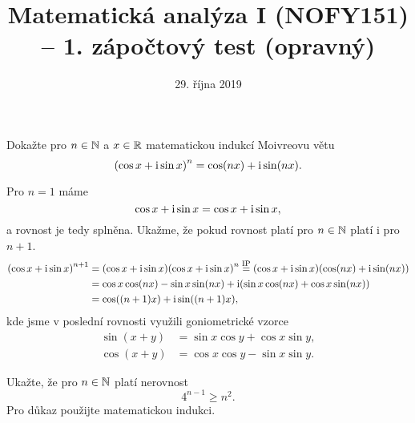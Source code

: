 \documentclass[answers]{exam}
\title{\vspace{-3ex}Matematická analýza I (NOFY151) – 1. zápočtový test (opravný)\vspace{-1ex}}
\author{\vspace{-2ex}}
\date{\vspace{-2ex}29. října 2019}
\begin{document}
\maketitle

\begin{questions}
  \question[2] Dokažte pro $n \in \mathbb{N}$ a $x \in \mathbb{R}$ matematickou indukcí Moivreovu větu
  \begin{equation*}
    \parens{\cos x + \iunit \sin x}^n
    =
    \cos (nx) + \iunit \sin (nx).
  \end{equation*}
  
  \begin{solution}
    Pro $n = 1$ máme
    \begin{equation*}
      \cos x + \mathrm{i} \sin x
      =
      \cos x + \mathrm{i} \sin x,
    \end{equation*}
    a rovnost je tedy splněna. Ukažme, že pokud rovnost platí pro $n \in \mathbb{N}$ platí i pro $n + 1$. 
    \begin{align*}
      \parens{\cos x + \iunit \sin x}^{n + 1}
      &=
      \parens{\cos x + \iunit \sin x} \parens{\cos x + \iunit \sin x}^n
      \texteq{IP}
      \parens{\cos x + \iunit \sin x}
      \parens{\cos (nx) + \iunit \sin (nx)}
      \\
      &=
      \cos x \cos (nx) - \sin x \sin (nx)
      +
      \iunit
      \parens{ \sin x \cos (nx) + \cos x \sin (nx) }
      \\
      &=
      \cos \parens{(n + 1) x} + \iunit \sin \parens{(n + 1) x},
    \end{align*}
    kde jsme v poslední rovnosti využili goniometrické vzorce
    \begin{align*}
      \sin (x + y) &= \sin x \cos y + \cos x \sin y,
      \\
      \cos (x + y) &= \cos x \cos y - \sin x \sin y.
    \end{align*}
    
  \end{solution}
  
  \question[2] Ukažte, že pro $n \in \mathbb{N}$ platí nerovnost
  \begin{equation*}
    4^{n - 1}
    \ge
    n^2.
  \end{equation*}
  Pro důkaz použijte matematickou indukci.
  

\end{questions}
\end{document}
